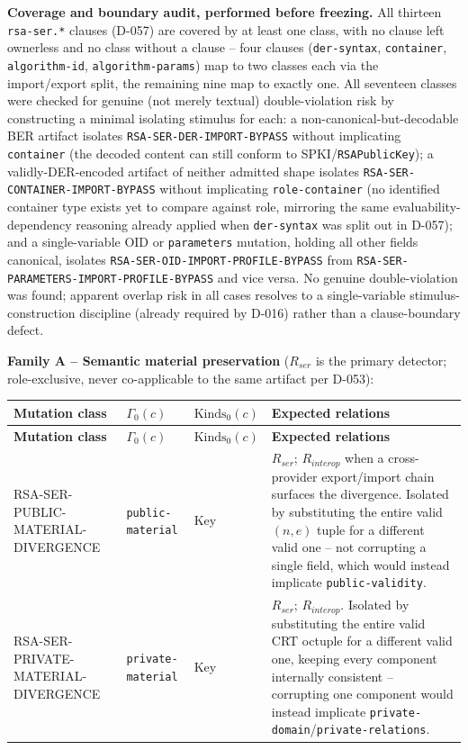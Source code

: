 \documentclass[11pt,a4paper]{article}
\begin{document}
\textbf{Coverage and boundary audit, performed before freezing.} All thirteen \texttt{rsa-ser.*} clauses (D-057) are covered by at least one class, with no clause left ownerless and no class without a clause -- four clauses (\texttt{der-syntax}, \texttt{container}, \texttt{algorithm-id}, \texttt{algorithm-params}) map to two classes each via the import/export split, the remaining nine map to exactly one. All seventeen classes were checked for genuine (not merely textual) double-violation risk by constructing a minimal isolating stimulus for each: a non-canonical-but-decodable BER artifact isolates \texttt{RSA-SER-DER-IMPORT-BYPASS} without implicating \texttt{container} (the decoded content can still conform to SPKI/\texttt{RSAPublicKey}); a validly-DER-encoded artifact of neither admitted shape isolates \texttt{RSA-SER-CONTAINER-IMPORT-BYPASS} without implicating \texttt{role-container} (no identified container type exists yet to compare against role, mirroring the same evaluability-dependency reasoning already applied when \texttt{der-syntax} was split out in D-057); and a single-variable OID or \texttt{parameters} mutation, holding all other fields canonical, isolates \texttt{RSA-SER-OID-IMPORT-PROFILE-BYPASS} from \texttt{RSA-SER-PARAMETERS-IMPORT-PROFILE-BYPASS} and vice versa. No genuine double-violation was found; apparent overlap risk in all cases resolves to a single-variable stimulus-construction discipline (already required by D-016) rather than a clause-boundary defect.

\textbf{Family A -- Semantic material preservation} ($R_{ser}$ is the primary detector; role-exclusive, never co-applicable to the same artifact per D-053):
\begin{longtable}{p{}p{}p{}p{}}
\toprule
\textbf{Mutation class} & \textbf{$\Gamma_0(c)$} & \textbf{$\text{Kinds}_0(c)$} & \textbf{Expected relations}\\
\midrule\endfirsthead
\toprule
\textbf{Mutation class} & \textbf{$\Gamma_0(c)$} & \textbf{$\text{Kinds}_0(c)$} & \textbf{Expected relations}\\
\midrule\endhead
RSA-SER-PUBLIC-MATERIAL-DIVERGENCE & \texttt{public-material} & Key & $R_{ser}$; $R_{interop}$ when a cross-provider export/import chain surfaces the divergence. Isolated by substituting the entire valid $(n,e)$ tuple for a different valid one -- not corrupting a single field, which would instead implicate \texttt{public-validity}.\\
RSA-SER-PRIVATE-MATERIAL-DIVERGENCE & \texttt{private-material} & Key & $R_{ser}$; $R_{interop}$. Isolated by substituting the entire valid CRT octuple for a different valid one, keeping every component internally consistent -- corrupting one component would instead implicate \texttt{private-domain}/\texttt{private-relations}.\\
\end{longtable}
\end{document}
